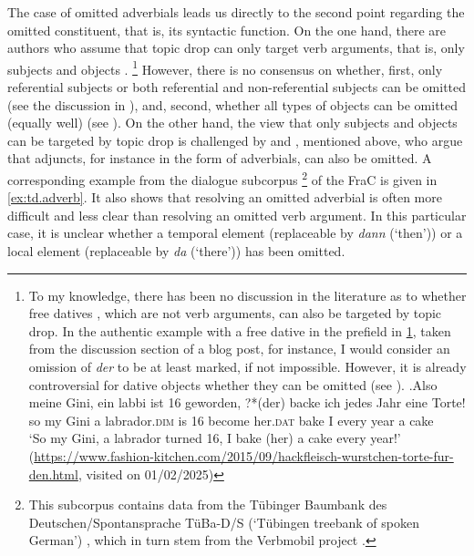 The case of omitted adverbials leads us directly to the second point regarding the omitted constituent, that is, its syntactic function.
On the one hand, there are authors who assume that topic drop can only target verb arguments,  that is, only subjects and objects \citep[e.g.,][]{cardinaletti1990,auer1993,jaensch2005,volodina.onea2012, imo2013}.%
\footnote{To my knowledge, there has been no discussion in the literature as to whether free datives  \citep{hole2014}, which are not verb arguments, can also be targeted by topic drop.
In the authentic example with a free dative in the prefield in \ref{ex:free.dative}, taken from the discussion section of a blog post, for instance, I would consider an omission of \textit{der} to be at least marked, if not impossible.
However, it is already controversial for dative objects whether they can be omitted (see ).
\exg.\label{ex:free.dative}Also meine Gini, ein labbi ist 16 geworden, ?*(der) backe ich jedes Jahr eine Torte!\\
so my Gini a labrador.\textsc{dim} is 16 become \phantom{?*}her.\textsc{dat} bake I every year a cake\\
`So my Gini, a labrador turned 16, I bake (her) a cake every year!' (\url{https://www.fashion-kitchen.com/2015/09/hackfleisch-wurstchen-torte-fur-den.html}, visited on 01/02/2025)

}
However, there is no consensus on whether, first, only referential subjects or both referential and non-referential subjects can be omitted (see the discussion in ), and, second, whether all types of objects can be omitted (equally well) (see ).
On the other hand, the view that only subjects and objects can be targeted by topic drop is challenged by \citet{fries1988} and \citet{schalowski2015}, mentioned above, who argue that adjuncts,  for instance in the form of adverbials, can also be omitted.
A corresponding example from the dialogue subcorpus%
\footnote{This subcorpus contains data from the Tübinger Baumbank des Deutschen/Spontansprache TüBa-D/S (`Tübingen treebank of spoken German') \citep{hinrichs.etal2000}, which in turn stem from the Verbmobil project \citep{burger.etal2000}.}
%
of the FraC is given in \ref{ex:td.adverb}.
It also shows that resolving an omitted adverbial  is often more difficult and less clear than resolving an omitted verb argument. 
In this particular case, it is unclear whether a temporal element (replaceable by \textit{dann} (`then')) or a local element (replaceable by \textit{da} (`there')) has been omitted.

